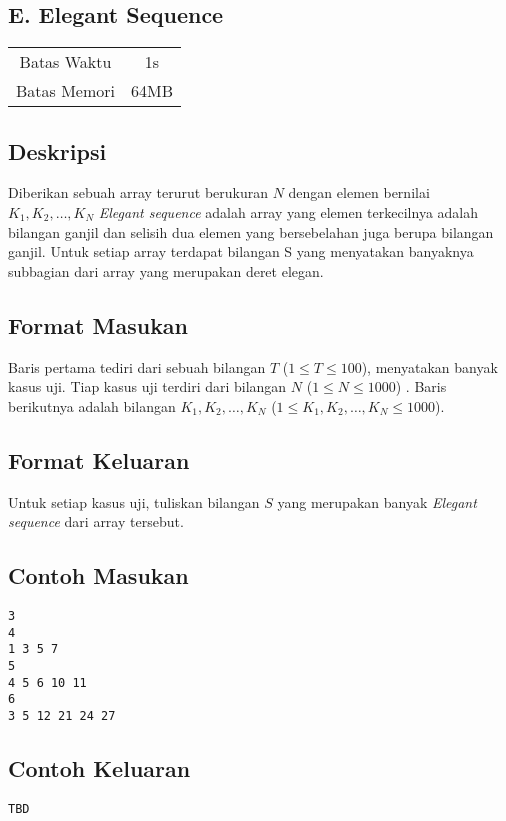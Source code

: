 \documentclass{article}
\begin{document}
\begin{center}
    \section*{E. Elegant Sequence} %

    \begin{tabular}{ | c c | }
        \hline
        Batas Waktu  & 1s \\    %
        Batas Memori & 64MB \\  %
        \hline
    \end{tabular}
\end{center}

\subsection*{Deskripsi}


Diberikan sebuah array terurut berukuran $N$ dengan elemen bernilai $K_1,K_2,\dots,K_N$
\textit{Elegant sequence} adalah array yang elemen terkecilnya adalah bilangan ganjil dan selisih dua elemen yang bersebelahan juga berupa bilangan ganjil.
Untuk setiap array terdapat bilangan S yang menyatakan banyaknya subbagian dari array yang merupakan deret elegan.

\subsection*{Format Masukan}

Baris pertama tediri dari sebuah bilangan $T$ ($1 \leq T \leq 100$), menyatakan banyak kasus uji.
Tiap kasus uji terdiri dari bilangan $N$ ($1 \leq N \leq 1000$) .
Baris berikutnya adalah bilangan $K_1,K_2,\dots,K_N$ ($1 \leq K_1,K_2,\dots,K_N \leq 1000$).

\subsection*{Format Keluaran}

Untuk setiap kasus uji, tuliskan bilangan $S$ yang merupakan banyak \textit{Elegant sequence} dari array tersebut.



\begin{multicols}{2}
\subsection*{Contoh Masukan}
\begin{lstlisting}
3
4 
1 3 5 7
5
4 5 6 10 11
6
3 5 12 21 24 27
\end{lstlisting}
\columnbreak
\subsection*{Contoh Keluaran}
\begin{lstlisting}
TBD
\end{lstlisting}
\vfill
\null
\end{multicols}




\pagebreak
\end{document}
